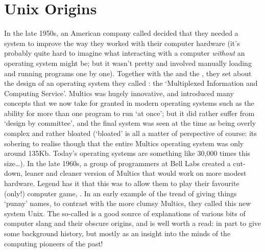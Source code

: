 \section{Unix Origins}
\label{sec:unix}

In the late 1950s, an American company
called  decided that they
needed a system to improve the way they worked with their computer
hardware (it's probably quite hard to imagine what interacting with a
computer \emph{without} an operating system might be; but it wasn't
pretty and involved manually loading and running programs one by
one). Together with the  and the , they set about the design of an operating system they
called : the `Multiplexed Information and
Computing Service'. Multics was hugely innovative, and introduced many
concepts that we now take for granted in modern operating systems such
as the ability for more than one program to run `at once'; but it did
rather suffer from `design by committee', and the final system was
seen at the time as being overly complex and rather bloated (`bloated'
is all a matter of perspective of course: its sobering to realise
though that the entire Multics operating system was only around
135Kb. Today's operating systems are something like 30,000 times this
size\ldots). In the late 1960s, a group of programmers at Bell Labs
created a cut-down, leaner and cleaner version of Multics that would
work on more modest hardware. Legend has it that this was to allow
them to play their favourite (only!) computer
game, . In an early
example of the trend of giving things `punny' names, to contrast with
the more clumsy Multics, they called this new system Unix. The
so-called  is a good source of
explanations of various bits of computer slang and their obscure
origins, and is well worth a read: in part to give some background
history, but mostly as an insight into the minds of the computing
pioneers of the past!


